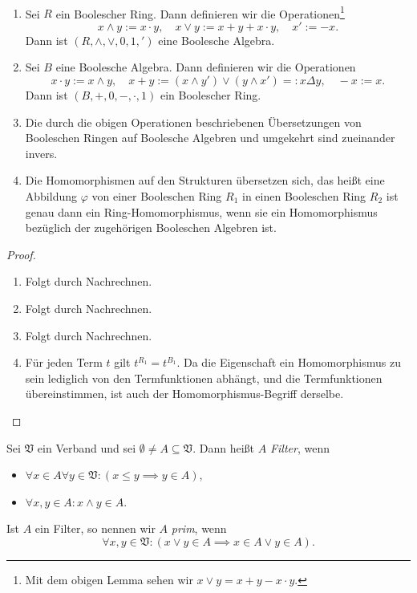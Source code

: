 \begin{proposition}{\ }
    \begin{enumerate}
        \item Sei $R$ ein Boolescher Ring. Dann definieren wir die Operationen\footnote{Mit dem obigen Lemma sehen wir $x \lor y = x + y - x \cdot y$.}
        $$ x \land y := x \cdot y, \quad x \lor y := x + y + x \cdot y, \quad x' := -x. $$
        Dann ist $(R, \land, \lor, 0, 1, ')$ eine Boolesche Algebra.

        \item Sei $B$ eine Boolesche Algebra. Dann definieren wir die Operationen
        $$ x \cdot y := x \land y, \quad x + y := (x \land y') \lor (y \land x') =: x \Delta y, \quad -x := x. $$
        Dann ist $(B, +, 0, -, \cdot, 1)$ ein Boolescher Ring.

        \item Die durch die obigen Operationen beschriebenen Übersetzungen von Booleschen Ringen auf Boolesche Algebren und umgekehrt sind zueinander invers.

        \item Die Homomorphismen auf den Strukturen übersetzen sich, das heißt eine Abbildung $\varphi$ von einer Booleschen Ring $R_1$ in einen Booleschen Ring $R_2$ ist genau dann ein Ring-Homomorphismus, wenn sie ein Homomorphismus bezüglich der zugehörigen Booleschen Algebren ist.
    \end{enumerate}
\end{proposition}

\begin{proof}{\ }
    \begin{enumerate}
        \item Folgt durch Nachrechnen.
        \item Folgt durch Nachrechnen.
        \item Folgt durch Nachrechnen.
        \item Für jeden Term $t$ gilt $t^{R_1}=t^{B_1}$. Da die Eigenschaft ein Homomorphismus zu sein lediglich von den Termfunktionen abhängt, und die Termfunktionen übereinstimmen, ist auch der Homomorphismus-Begriff derselbe.
    \end{enumerate}
\end{proof}

\begin{definition}
    Sei $\mathfrak{V}$ ein Verband und sei $\emptyset \neq A \subseteq \mathfrak{V}$. Dann heißt $A$ \emph{Filter}, wenn
    \begin{itemize}
        \item $\forall x \in A \forall y \in \mathfrak{V} : ( x \leq y \implies y \in A )$,
        \item $\forall x, y \in A : x \land y \in A$.
    \end{itemize}
    Ist $A$ ein Filter, so nennen wir $A$ \emph{prim}, wenn
    $$ \forall x ,y \in \mathfrak{V} : ( x \lor y \in A \implies x \in A \lor y \in A ). $$
    
\end{definition}

